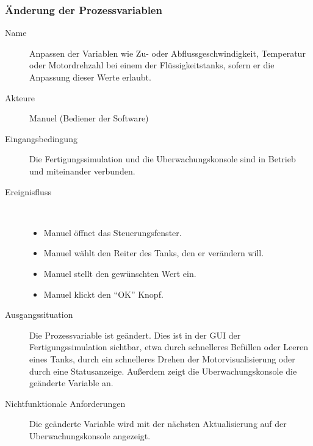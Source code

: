 \documentclass[parskip=full]{scrartcl}
\begin{document}
\subsubsection{Änderung der Prozessvariablen}
\begin{description}
  \item[Name] Anpassen der Variablen wie Zu- oder Abflussgeschwindigkeit, Temperatur oder Motordrehzahl bei einem der
  Flüssigkeitstanks, sofern er die Anpassung dieser Werte erlaubt.
  \item[Akteure] Manuel (Bediener der Software)
  \item[Eingangsbedingung] Die \gls{Fertigungssimulation} und die \gls{Uberwachungskonsole} sind in Betrieb und miteinander verbunden.
  \item[Ereignisfluss]~\\
\begin{itemize}[noitemsep]
  \item Manuel öffnet das Steuerungsfenster.
  \item Manuel wählt den Reiter des Tanks, den er verändern will.
  \item Manuel stellt den gewünschten Wert ein.
  \item Manuel klickt den "`OK"' Knopf.
\end{itemize}
  \item[Ausgangssituation] Die Prozessvariable ist geändert. Dies ist in der GUI der Fertigungssimulation sichtbar, etwa durch schnelleres Befüllen oder Leeren eines Tanks,
  durch ein schnelleres Drehen der Motorvisualisierung oder durch eine Statusanzeige.
    Außerdem zeigt die \gls{Uberwachungskonsole} die geänderte Variable an.
  \item [Nichtfunktionale Anforderungen] Die geänderte Variable wird mit der nächsten Aktualisierung auf der \gls{Uberwachungskonsole} angezeigt.
\end{description}
\end{document}
